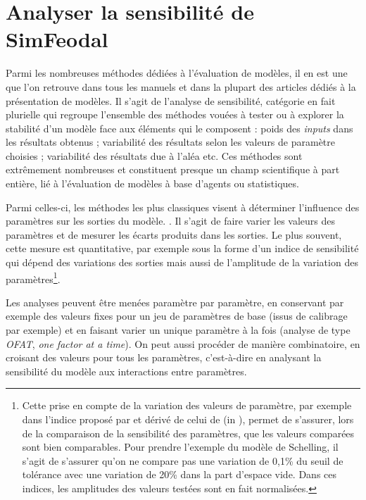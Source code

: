 \clearpage
\section{Analyser la sensibilité de SimFeodal \label{sec:ana-sensib}}

Parmi les nombreuses méthodes dédiées à l'évaluation de modèles, il en est une que l'on retrouve dans tous les manuels et dans la plupart des articles dédiés à la présentation de modèles.
Il s'agit de l'analyse de sensibilité, catégorie en fait plurielle qui regroupe l'ensemble des méthodes vouées à tester ou à explorer la stabilité d'un modèle face aux éléments qui le composent :
poids des \textit{inputs} dans les résultats obtenus ; variabilité des résultats selon les valeurs de paramètre choisies ; variabilité des résultats due à l'aléa etc.
Ces méthodes sont extrêmement nombreuses et constituent presque un champ scientifique à part entière, lié à l'évaluation de modèles à base d'agents ou statistiques.

Parmi celles-ci, les méthodes les plus classiques \autocite[257]{crooks_agent-based_2019} visent à \og déterminer l'influence des paramètres sur les sorties du modèle.\fg{} \autocite[75]{ginot2005explorer}.
Il s'agit de faire varier les valeurs des paramètres et de mesurer les écarts produits dans les sorties.
Le plus souvent, cette mesure est quantitative, par exemple sous la forme d'un \og indice de sensibilité\fg{} qui dépend des variations des sorties mais aussi de l'amplitude de la variation des paramètres\footnote{
	Cette prise en compte de la variation des valeurs de paramètre, par exemple dans l'indice proposé par \textcite[258]{crooks_agent-based_2019} et dérivé de celui de \textcite{hamby_review_1994} (in \cite[201]{osullivan_spatial_2013}), permet de s'assurer, lors de la comparaison de la sensibilité des paramètres, que les valeurs comparées sont bien comparables.
	Pour prendre l'exemple du modèle de Schelling, il s'agit de s'assurer qu'on ne compare pas une variation de 0,1\% du seuil de tolérance avec une variation de 20\% dans la part d'espace vide.
	Dans ces indices, les amplitudes des valeurs testées sont en fait normalisées.
}.

Les analyses peuvent être menées paramètre par paramètre, en conservant par exemple des valeurs fixes pour un jeu de paramètres de base (issus de calibrage par exemple) et en faisant varier un unique paramètre à la fois (analyse de type \textit{OFAT}, \og \textit{one factor at a time}\fg{}).
On peut aussi procéder de manière combinatoire, en croisant des valeurs pour tous les paramètres, c'est-à-dire en analysant la sensibilité du modèle aux interactions entre paramètres.

